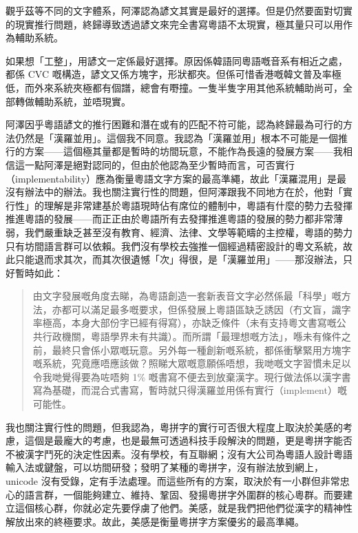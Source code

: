 \documentclass[a5paper, 10pt, openany]{book} %
\begin{document}
  
觀乎茲等不同的文字體系，阿澤認為諺文其實是最好的選擇。但是仍然要面對切實的現實推行問題，終歸導致透過諺文來完全書寫粵語不太現實，極其量只可以用作為輔助系統。

如果想「工整」，用諺文一定係最好選擇。原因係韓語同粵語嘅音系有相近之處，都係 CVC 嘅構造，諺文又係方塊字，形狀都夾。但係可惜香港嘅韓文普及率極低，而外來系統夾極都有個譜，總會有嘢撞。一隻半隻字用其他系統輔助尚可，全部轉做輔助系統，並唔現實。

阿澤因乎粵語諺文的推行困難和潛在或有的匹配不符可能，認為終歸最為可行的方法仍然是「漢羅並用」。這個我不同意。我認為「漢羅並用」根本不可能是一個推行的方案——這個極其量都是暫時的坊間玩意，不能作為長遠的發展方案——我相信這一點阿澤是絕對認同的，但由於他認為至少暫時而言，可否實行（implementability）應為衡量粵語文字方案的最高準繩，故此「漢羅混用」是最沒有辦法中的辦法。我也關注實行性的問題，但阿澤跟我不同地方在於，他對「實行性」的理解是非常建基於粵語現時佔有席位的體制中，粵語有什麼的勢力去發揮推進粵語的發展——而正正由於粵語所有去發揮推進粵語的發展的勢力都非常薄弱，我們嚴重缺乏甚至沒有教育、經濟、法律、文學等範疇的主控權，粵語的勢力只有坊間語言群可以依賴。我們沒有學校去強推一個經過精密設計的粵文系統，故此只能退而求其次，而其次很遺憾「次」得很，是「漢羅並用」——那沒辦法，只好暫時如此：


\begin{quotation}
  由文字發展嘅角度去睇，為粵語創造一套新表音文字必然係最「科學」嘅方法，亦都可以滿足最多嘅要求，但係發展上粵語區缺乏誘因（冇文盲，識字率極高，本身大部份字已經有得寫），亦缺乏條件（未有支持粵文書寫嘅公共行政機關，粵語學界未有共識）。而所謂「最理想嘅方法」，喺未有條件之前，最終只會係小眾嘅玩意。另外每一種創新嘅系統，都係衝擊緊用方塊字嘅系統，究竟應唔應該做？照睇大眾嘅意願係唔想，我哋嘅文字習慣未足以令我哋覺得要為咗唔夠 1\% 嘅書寫不便去到放棄漢字。現行做法係以漢字書寫為基礎，而混合式書寫，暫時就只得漢羅並用係有實行（implement）嘅可能性。
  
\end{quotation}

我也關注實行性的問題，但我認為，粵拼字的實行可否很大程度上取決於美感的考慮，這個是最龐大的考慮，也是最無可透過科技手段解決的問題，更是粵拼字能否不被漢字鬥死的決定性因素。沒有學校，有互聯網；沒有大公司為粵語人設計粵語輸入法或鍵盤，可以坊間研發；發明了某種的粵拼字，沒有辦法放到網上，unicode 沒有受錄，定有手法處理。而這些所有的方案，取決於有一小群但非常忠心的語言群，一個能夠建立、維持、鞏固、發揚粵拼字外圍群的核心粵群。而要建立這個核心群，你就必定先要俘虜了他們。美感，就是我們把他們從漢字的精神性解放出來的終極要求。故此，美感是衡量粵拼字方案優劣的最高準繩。
\end{document}
